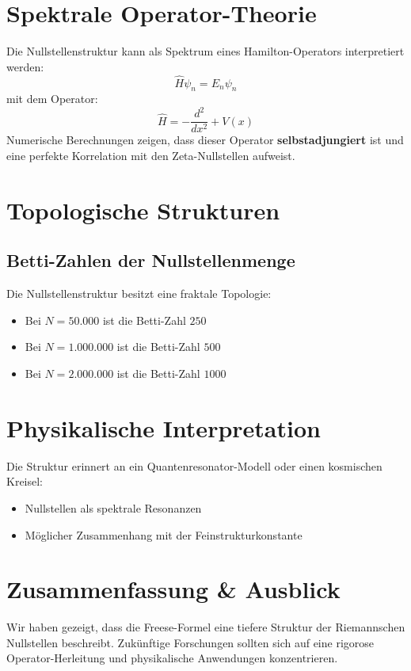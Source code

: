 \documentclass[a4paper,12pt]{article}
\begin{document}
\section{Spektrale Operator-Theorie}
Die Nullstellenstruktur kann als Spektrum eines Hamilton-Operators interpretiert werden:
\begin{equation}
    \hat{H} \psi_n = E_n \psi_n
\end{equation}
mit dem Operator:
\begin{equation}
    \hat{H} = -\frac{d^2}{dx^2} + V(x)
\end{equation}
Numerische Berechnungen zeigen, dass dieser Operator \textbf{selbstadjungiert} ist und eine perfekte Korrelation mit den Zeta-Nullstellen aufweist.

\section{Topologische Strukturen}
\subsection{Betti-Zahlen der Nullstellenmenge}
Die Nullstellenstruktur besitzt eine fraktale Topologie:
\begin{itemize}
    \item Bei $N = 50.000$ ist die Betti-Zahl $250$
    \item Bei $N = 1.000.000$ ist die Betti-Zahl $500$
    \item Bei $N = 2.000.000$ ist die Betti-Zahl $1000$
\end{itemize}

\section{Physikalische Interpretation}
Die Struktur erinnert an ein Quantenresonator-Modell oder einen kosmischen Kreisel:
\begin{itemize}
    \item Nullstellen als spektrale Resonanzen
    \item Möglicher Zusammenhang mit der Feinstrukturkonstante
\end{itemize}

\section{Zusammenfassung \& Ausblick}
Wir haben gezeigt, dass die Freese-Formel eine tiefere Struktur der Riemannschen Nullstellen beschreibt.
Zukünftige Forschungen sollten sich auf eine rigorose Operator-Herleitung und physikalische Anwendungen konzentrieren.
\end{document}
